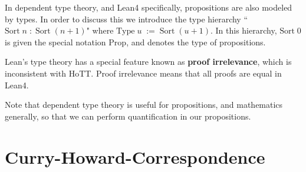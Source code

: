 In dependent type theory, and Lean4 specifically, propositions are also modeled by types. In order to discuss this we introduce the type hierarchy ``$\text{Sort}\;n\;:\;\text{Sort}\;(n+1)$" where $\text{Type}\;u\;:=\;\text{Sort}\;(u+1)$. In this hierarchy, $\text{Sort}\;0$ is given the special notation $\text{Prop}$, and denotes the type of propositions.

Lean's type theory has a special feature known as \textbf{proof irrelevance}, which is inconsistent with HoTT. Proof irrelevance means that all proofs are equal in Lean4. 

Note that dependent type theory is useful for propositions, and mathematics generally, so that we can perform quantification in our propositions.


\section{Curry-Howard-Correspondence}






